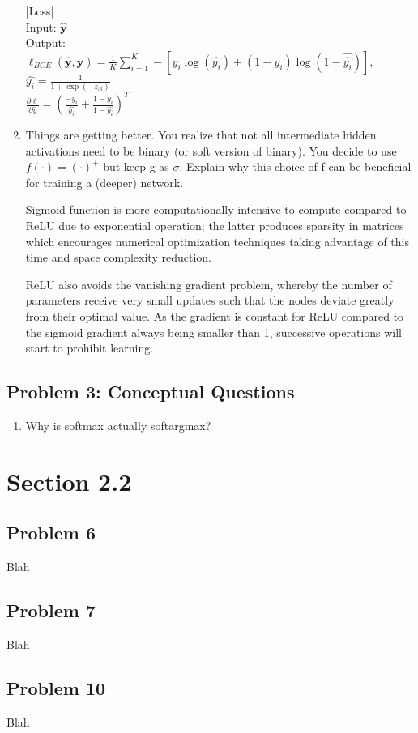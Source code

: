 \documentclass{article}
\begin{document}
\begin{enumerate}
      \begin{tcolorbox}
          |Loss|\\
          Input: $\bm{\hat{y}}$\\
          Output: $\ell_{BCE}(\bm{\hat{y},y})=\frac{1}{K}\sum_{i=1}^{K}-[y_i\log(\hat{y_i})+(1-y_i)\log(1-\hat{\hat{y_i}})],$\\
          $\hat{y_i}=\frac{1}{1+\exp(-z_{3i})}$\\
          $\frac{\partial \ell}{\partial \hat{y}}=(\frac{-y_i}{\hat{y_i}}+\frac{1-y_i}{1-\hat{y_i}})^T$
      \end{tcolorbox}
  \item Things are getting better. You realize that not all intermediate hidden activations need to be binary (or soft version of binary). You decide to use $f(\cdot)=(\cdot)^{+}$ but keep g as $\sigma$. Explain why this choice of f can be beneficial for training a (deeper) network.
      \begin{tcolorbox}
        Sigmoid function is more computationally intensive to compute compared to ReLU due to exponential operation; the latter produces sparsity in matrices which encourages numerical optimization techniques taking advantage of this time and space complexity reduction. 
      \end{tcolorbox}
      \begin{tcolorbox}
        ReLU also avoids the vanishing gradient problem, whereby the number of parameters receive very small updates such that the nodes deviate greatly from their optimal value. As the gradient is constant for ReLU compared to the sigmoid gradient always being smaller than 1, successive operations will start to prohibit learning.
      \end{tcolorbox}
\end{enumerate}

\subsection*{Problem 3: Conceptual Questions}
%
\begin{enumerate}
  \item Why is softmax actually softargmax?
    \begin{tcolorbox}
    
  \end{tcolorbox}
\end{enumerate}

\section*{Section 2.2}
%
\subsection*{Problem 6}
Blah
\subsection*{Problem 7}
Blah
\subsection*{Problem 10}
Blah
\end{document}
